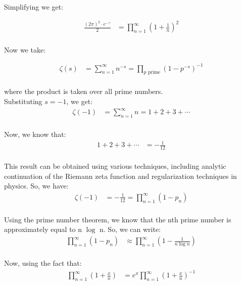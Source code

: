 \documentclass{article}
\begin{document}
Simplifying we get:

\begin{align*}
\frac{(2\pi)^2\cdot e^{-\gamma}}{2} &= \prod_{n=1}^{\infty}(1+\frac{1}{n})^2 \\
\end{align*}

Now we take:

\begin{align*}
\zeta(s) &= \sum_{n=1}^{\infty}n^{-s} = \prod_{p\text{ prime}}(1-p^{-s})^{-1} \\
\end{align*}

where the product is taken over all prime numbers. \\

Substituting  $s = -1$, we get: \\

\begin{align*}
\zeta(-1) &= \sum_{n=1}^{\infty} n = 1 + 2 + 3 + \cdots \\
\end{align*}

Now, we know that: \\

\begin{align*}
1 + 2 + 3 + \cdots &= -\frac{1}{12} \\
\end{align*}

This result can be obtained using various techniques, including analytic continuation of the Riemann zeta function and regularization techniques in physics. So, we have: \\

\begin{align*}
\zeta(-1) &= -\frac{1}{12} = \prod_{n=1}^{\infty} (1 - p_n) \\
\end{align*}

Using the prime number theorem, we know that the nth prime number is approximately equal to  n $\log$ n. So, we can write: \\

\begin{align*}
\prod_{n=1}^{\infty} (1 - p_n) &\approx \prod_{n=1}^{\infty} \left(1 - \frac{1}{n \log n}\right) \\
\end{align*}

Now, using the fact that: \\

\begin{align*}
\prod_{n=1}^{\infty} \left(1 + \frac{x}{n}\right) &= e^x \prod_{n=1}^{\infty} \left(1 + \frac{x}{n}\right)^{-1} \\
\end{align*}
\end{document}

